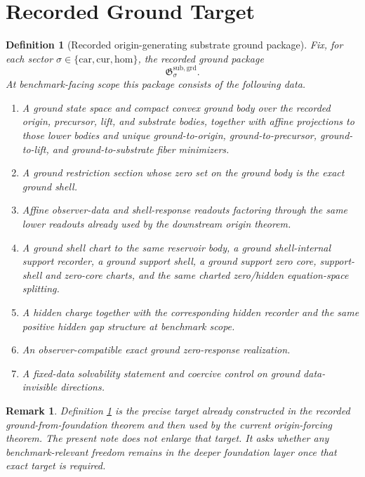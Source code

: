 \documentclass[11pt]{article}
\newcommand{\Car}{\mathrm{car}}
\newcommand{\Cur}{\mathrm{cur}}
\newcommand{\Hom}{\mathrm{hom}}
\newcommand{\GroundPackage}{\mathfrak G^{\mathrm{sub,grd}}}
\newtheorem{definition}{Definition}
\newtheorem{remark}{Remark}
\begin{document}
\section{Recorded Ground Target}

\begin{definition}[Recorded origin-generating substrate ground package]
\label{def:ground}
Fix, for each sector \(\sigma\in\{\Car,\Cur,\Hom\}\), the recorded ground package
\[
\GroundPackage_{\sigma}.
\]
At benchmark-facing scope this package consists of the following data.
\begin{enumerate}
    \item A ground state space and compact convex ground body over the recorded origin, precursor, lift, and substrate bodies, together with affine projections to those lower bodies and unique ground-to-origin, ground-to-precursor, ground-to-lift, and ground-to-substrate fiber minimizers.
    \item A ground restriction section whose zero set on the ground body is the exact ground shell.
    \item Affine observer-data and shell-response readouts factoring through the same lower readouts already used by the downstream origin theorem.
    \item A ground shell chart to the same reservoir body, a ground shell-internal support recorder, a ground support shell, a ground support zero core, support-shell and zero-core charts, and the same charted zero/hidden equation-space splitting.
    \item A hidden charge together with the corresponding hidden recorder and the same positive hidden gap structure at benchmark scope.
    \item An observer-compatible exact ground zero-response realization.
    \item A fixed-data solvability statement and coercive control on ground data-invisible directions.
\end{enumerate}
\end{definition}

\begin{remark}
Definition \ref{def:ground} is the precise target already constructed in the recorded ground-from-foundation theorem and then used by the current origin-forcing theorem. The present note does not enlarge that target. It asks whether any benchmark-relevant freedom remains in the deeper foundation layer once that exact target is required.
\end{remark}
\end{document}
